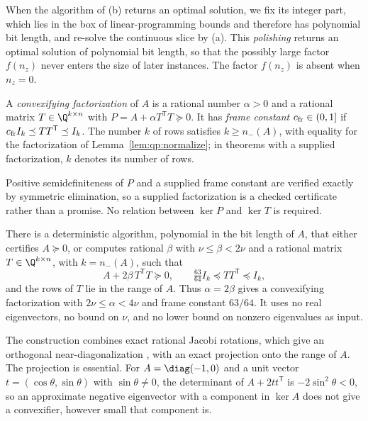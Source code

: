 When the algorithm of (b) returns an optimal solution, we fix its integer
part, which lies in the box of linear-programming bounds and therefore has
polynomial bit length, and re-solve the continuous slice by (a). This
\emph{polishing} returns an optimal solution of polynomial bit length, so
that the possibly large factor $f(n_z)$ never enters the size of later
instances. The factor $f(n_z)$ is absent when $n_z=0$.

\begin{definition}\label{def:qp:factor}
A \emph{convexifying factorization} of $A$ is a rational number $\alpha>0$
and a rational matrix $T\in\Q^{k\times n}$ with $P=A+\alpha T^{\mathsf T} T\succeq0$.
It has \emph{frame constant} $c_{\rm fr}\in(0,1]$ if
$c_{\rm fr}I_k\preceq TT^{\mathsf T}\preceq I_k$. The number $k$ of rows satisfies
$k\ge n_-(A)$, with equality for the factorization of
Lemma~\ref{lem:qp:normalize}; in theorems with a supplied factorization, $k$
denotes its number of rows.
\end{definition}

Positive semidefiniteness of $P$ and a supplied frame constant are verified
exactly by symmetric elimination, so a supplied factorization is a checked
certificate rather than a promise. No relation between $\ker P$ and $\ker T$
is required.

\begin{lemma}\label{lem:qp:normalize}
There is a deterministic algorithm, polynomial in the bit length of $A$, that
either certifies $A\succeq0$, or computes rational $\beta$ with
$\nu\le\beta<2\nu$ and a rational matrix $T\in\Q^{k\times n}$, with
$k=n_-(A)$, such that
\[
 A+2\beta\,T^{\mathsf T} T\succeq0,
 \qquad
 \tfrac{63}{64}I_k\preceq TT^{\mathsf T}\preceq I_k,
\]
and the rows of $T$ lie in the range of $A$. Thus $\alpha=2\beta$ gives a
convexifying factorization with $2\nu\le\alpha<4\nu$ and frame constant
$63/64$. It uses no real eigenvectors, no bound on $\nu$, and no lower bound
on nonzero eigenvalues as input.
\end{lemma}

The construction combines exact rational Jacobi rotations, which give an
orthogonal near-diagonalization \cite{pia2026-rational-jacobi-rotations-and-the},
with an exact projection onto the range of $A$. The projection is essential.
For $A=\diag(-1,0)$ and a unit vector $t=(\cos\theta,\sin\theta)$ with
$\sin\theta\ne0$, the determinant of $A+2tt^{\mathsf T}$ is $-2\sin^2\theta<0$, so an
approximate negative eigenvector with a component in $\ker A$ does not give a
convexifier, however small that component is.

